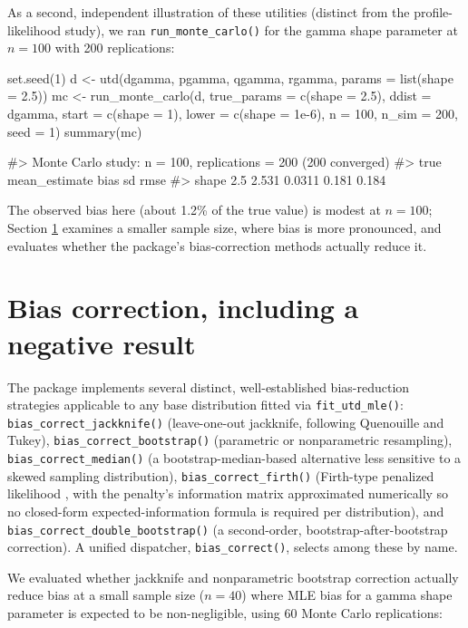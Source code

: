 As a second, independent illustration of these utilities (distinct from
the profile-likelihood study), we ran \texttt{run\_monte\_carlo()} for
the gamma shape parameter at $n=100$ with 200 replications:

\begin{example}
set.seed(1)
d <- utd(dgamma, pgamma, qgamma, rgamma, params = list(shape = 2.5))
mc <- run_monte_carlo(d, true_params = c(shape = 2.5), ddist = dgamma,
                       start = c(shape = 1), lower = c(shape = 1e-6),
                       n = 100, n_sim = 200, seed = 1)
summary(mc)
\end{example}
\begin{example}
#> Monte Carlo study: n = 100, replications = 200 (200 converged)
#>       true mean_estimate   bias    sd  rmse
#> shape  2.5         2.531 0.0311 0.181 0.184
\end{example}
The observed bias here (about 1.2\% of the true value) is modest at
$n=100$; Section \ref{sec:bias} examines a smaller sample size, where
bias is more pronounced, and evaluates whether the package's
bias-correction methods actually reduce it.

\section{Bias correction, including a negative result}
\label{sec:bias}

The package implements several distinct, well-established
bias-reduction strategies applicable to any base distribution fitted via
\texttt{fit\_utd\_mle()}: \texttt{bias\_correct\_jackknife()} (leave-one-out
jackknife, following Quenouille and Tukey),
\texttt{bias\_correct\_bootstrap()} (parametric or nonparametric
resampling), \texttt{bias\_correct\_median()} (a bootstrap-median-based
alternative less sensitive to a skewed sampling distribution),
\texttt{bias\_correct\_firth()} (Firth-type penalized likelihood
\citep{firth1993}, with the penalty's information matrix approximated
numerically so no closed-form expected-information formula is required
per distribution), and \texttt{bias\_correct\_double\_bootstrap()} (a
second-order, bootstrap-after-bootstrap correction). A unified
dispatcher, \texttt{bias\_correct()}, selects among these by name.

We evaluated whether jackknife and nonparametric bootstrap correction
actually reduce bias at a small sample size ($n=40$) where MLE bias for
a gamma shape parameter is expected to be non-negligible, using 60
Monte Carlo replications:

